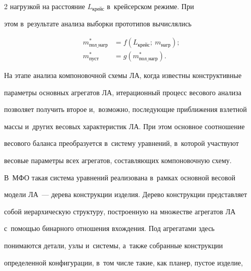 \begin{multicols}{2}
на\-груз\-кой на рас\-сто\-яние $L_{\mathrm{крейс}}$ в~крейсерском режиме. При 


этом в~результате анализа выборки прототипов вы\-чис\-ля\-лись 





\vspace*{-4pt}





 \noindent


\begin{align*}


m^*_{\mathrm{пол\_нагр}} &= f\left(L_{\mathrm{крейс}};\ m_{\mathrm{нагр}}\right);\\


 m^*_{\mathrm{пуст}}  &= g(m^*_{\mathrm{пол\_нагр}}).


 \end{align*}





\vspace*{-4pt}


  


 


  На этапе анализа компоновочной схемы ЛА, когда известны конструктивные 


параметры основных агрегатов ЛА, итерационный процесс весового анализа 


позволяет получить второе и,~возможно, по\-сле\-ду\-ющие при\-бли\-же\-ния взлетной 


массы и~других весовых характеристик ЛА. При этом основное соотношение 


весового баланса преобразуется в~сис\-те\-му уравнений, в~которой участвуют 


весовые па\-ра\-мет\-ры всех агрегатов, со\-став\-ля\-ющих компоновочную схему. 


В~МФО такая сис\-те\-ма уравнений реализована в~рамках основной весовой 


модели ЛА~--- дерева конструкции изделия. Дерево конструкции представляет 


собой иерархическую структуру, построенную на множестве агрегатов ЛА 


с~помощью бинарного отношения вхож\-де\-ния. Под агрегатами здесь 


понимаются детали, узлы и~сис\-те\-мы, а~так\-же собранные конструкции 


определенной конфигурации, в~том чис\-ле такие, как планер, пустое изделие, 



\end{multicols}
